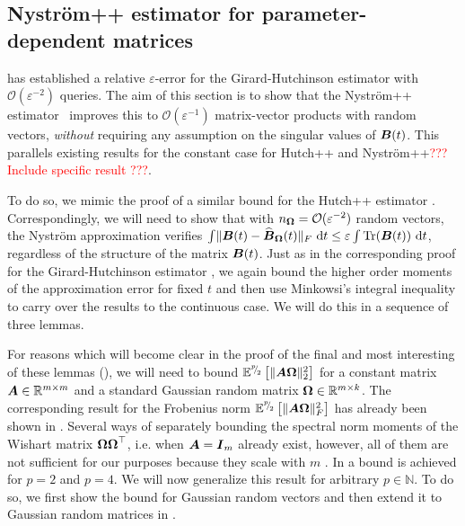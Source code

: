\subsection{Nyström++ estimator for parameter-dependent matrices}
\label{subsec:nystrom-pp}


 has established a relative $\varepsilon$-error for the Girard-Hutchinson estimator with $\mathcal{O}(\varepsilon^{-2})$ queries. The aim of this section is to show that the Nyström++ estimator~ improves this to $\mathcal{O}(\varepsilon^{-1})$ matrix-vector products with random vectors, \emph{without} requiring any assumption on the singular values of $\boldsymbol{B}(t)$. This parallels existing results for the constant case
for Hutch++\cite[Theorem 3.1]{meyer-2021-hutch-optimal} and Nyström++\textcolor{red}{??? Include specific result ???}.

\color{black}

To do so, we mimic the proof of a similar bound for the Hutch++ estimator . Correspondingly, we will need to show that with $n_{\boldsymbol{\Omega}} = \mathcal{O}(\varepsilon^{-2})$ random vectors, the Nyström approximation verifies $\int \lVert \boldsymbol{B}(t) - \widehat{\boldsymbol{B}}_{\boldsymbol{\Omega}}(t)\rVert _F~\mathrm{d}t \leq \varepsilon \int \operatorname{Tr}(\boldsymbol{B}(t))~\mathrm{d}t$, regardless of the structure of the matrix $\boldsymbol{B}(t)$. Just as in the corresponding proof for the Girard-Hutchinson estimator , we again bound the higher order moments of the approximation error for fixed $t$ and then use Minkowsi's integral inequality to carry over the results to the continuous case. We will do this in a sequence of three lemmas.

For reasons which will become clear in the proof of the final and most interesting of these lemmas (), we will need to bound $\mathbb{E}^{{}^{p}{\mskip -5mu/\mskip -3mu}_{2}}\left[\lVert \boldsymbol{A} \boldsymbol{\Omega} \rVert _2^2 \right]$ for a constant matrix $\boldsymbol{A} \in \mathbb{R}^{m \times m}$ and a standard Gaussian random matrix $\boldsymbol{\Omega} \in \mathbb{R}^{m \times k}$. The corresponding result for the Frobenius norm $\mathbb{E}^{{}^{p}{\mskip -5mu/\mskip -3mu}_{2}}\left[\lVert \boldsymbol{A} \boldsymbol{\Omega} \rVert _F^2 \right]$ has already been shown in \cite[Lemma 7]{kressner-2023-randomized-lowrank}. Several ways of separately bounding the spectral norm moments of the Wishart matrix $\boldsymbol{\Omega} \boldsymbol{\Omega}^{\top}$, i.e. when $\boldsymbol{A} = \boldsymbol{I}_m$ already exist, however, all of them are not sufficient for our purposes because they scale with $m$ \cite{chen-2005-condition-numbers, edelman-1988-eigenvalues-condition, james-1964-distributions-matrix}. In \cite[Lemma B.1]{tropp-2023-randomized-algorithms} a bound is achieved for $p = 2$ and $p = 4$. We will now generalize this result for arbitrary $p \in \mathbb{N}$. To do so, we first show the bound for Gaussian random vectors and then extend it to Gaussian random matrices in .


